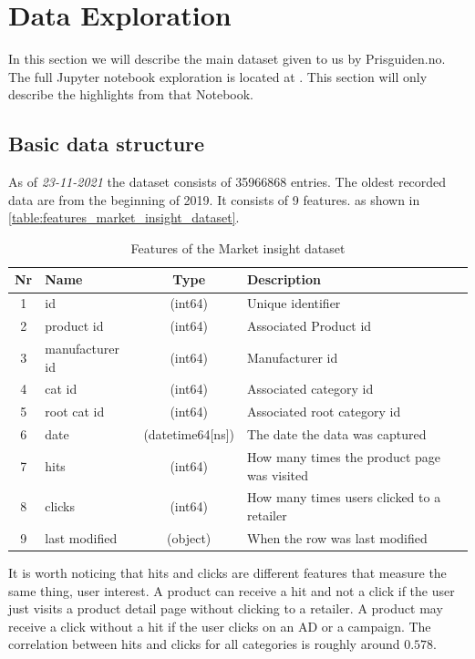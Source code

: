 \section{Data Exploration}
\label{section:Architecture:DataExploration}
In this section we will describe the main dataset given to us 
by Prisguiden.no. The full Jupyter notebook exploration
is located at \cite{notebook-data-exploration}. This section will only
describe the highlights from that Notebook.

\subsection{Basic data structure}
As of \textit{23-11-2021} the dataset consists of 35966868 entries.
The oldest recorded data are from the beginning of 2019.
It consists of 9 features.
as shown in \autoref{table:features_market_insight_dataset}.
\begin{table}[htbp]
  \centering
  \caption{Features of the Market insight dataset}
  \label{table:features_market_insight_dataset}
  \begin{tabular}{|c|l|c|l|}\hline\hline
   Nr & Name & Type & Description \\ \hline 
   1 &id &(int64) & Unique identifier \\ \hline
  2 & product id & (int64) & Associated Product id \\ \hline
  3 & manufacturer id & (int64) & Manufacturer id \\ \hline
  4 &cat id & (int64) & Associated category id \\ \hline
  5 & root cat id & (int64) & Associated root category id \\ \hline
  6 & date & (datetime64[ns]) & The date the data was captured \\ \hline
  7 & hits & (int64) & How many times the product page was visited \\ \hline
  8 &clicks & (int64) & How many times users clicked to a retailer \\ \hline
  9 & last modified & (object) & When the row was last modified \\ \hline
  \end{tabular}
\end{table}

It is worth noticing that hits and clicks are different features that measure the same thing, user interest.
A product can receive a hit and not a click if the user just visits a product detail page without clicking to a retailer.
A product may receive a click without a hit if the user clicks on an AD or a campaign.
The correlation between hits and clicks for all categories is roughly around $0.578$.

